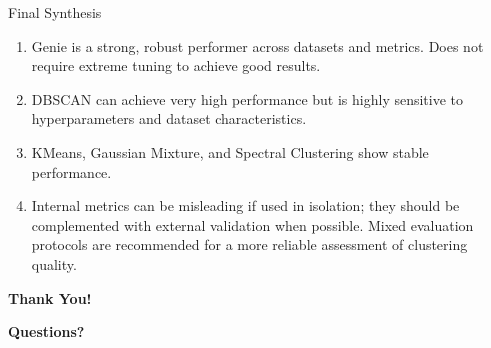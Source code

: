 \documentclass[aspectratio=169]{beamer}
\begin{document}
\begin{frame}{Final Synthesis}
    \begin{enumerate}
        \item Genie is a strong, robust performer across datasets and metrics. Does not require extreme tuning to achieve good results.
        \item DBSCAN can achieve very high performance but is highly sensitive to hyperparameters and dataset characteristics.
        \item KMeans, Gaussian Mixture, and Spectral Clustering show stable performance.
        \item Internal metrics can be misleading if used in isolation; they should be complemented with external validation when possible. Mixed evaluation protocols are recommended for a more reliable assessment of clustering quality.
    \end{enumerate}
\end{frame}

\begin{frame}[plain]
    \centering
    \Huge \textbf{Thank You!}

    \vspace{1.5em}
    \large
    \textbf{Questions?}
\end{frame}
\end{document}
